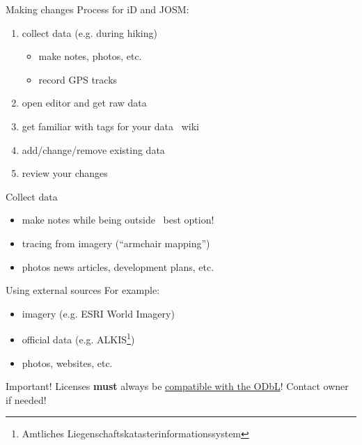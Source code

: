 \documentclass{beamer}
\begin{document}
			\begin{frame}{Making changes}
				Process for iD and JOSM:
				\begin{enumerate}
					\item collect data (e.g. during hiking)
					\begin{itemize}
						\item make notes, photos, etc.
						\item record GPS tracks
					\end{itemize}\pause
					\item open editor and get raw data\pause
					\item get familiar with tags for your data \textrightarrow\ wiki\pause
					\item add/change/remove existing data\pause
					\item review your changes
				\end{enumerate}
			\end{frame}
			
			\begin{frame}{Collect data}
				\begin{itemize}
					\item make notes while being outside \textleftarrow\ best option!
					\item tracing from imagery (\enquote{armchair mapping})
					\item photos news articles, development plans, etc.
				\end{itemize}
			\end{frame}
			
			\begin{frame}{Using external sources}
				For example:
				\begin{itemize}
					\item imagery (e.g. ESRI World Imagery)
					\item official data (e.g. ALKIS\footnote{Amtliches Liegenschaftskatasterinformationssystem})
					\item photos, websites, etc.
				\end{itemize}
				\pause
				\vspace{0.25cm}
				{
					\begin{block}{Important!}
						Licenses \textbf{must} always be \href{https://wiki.openstreetmap.org/wiki/Import/ODbL_Compatibility}{compatible with the ODbL}! Contact owner if needed!
					\end{block}
				}
			\end{frame}
			
\end{document}
